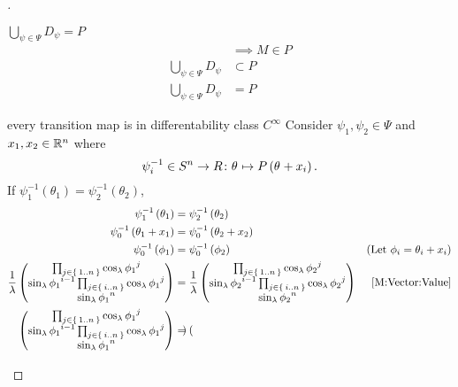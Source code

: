 \documentclass[../main.tex]{subfiles}
\begin{document}
\begin{proof}[]
\begin{subproof}{$\bigcup_{\psi\in\Psi} D_\psi=P$}
\begin{align*}
&\implies M\in P\\
\bigcup_{\psi\in\Psi}D_\psi&\subset P\\
\bigcup_{\psi\in\Psi} D_\psi&= P
\end{align*}
\end{subproof}
\begin{subproof}{every transition map is in differentability class $C^\infty$}
Consider $\psi_1,\psi_2\in\Psi$ and $x_1, x_2\in\mathbb{R}^n$ where
\begin{equation*}
\psi_i^{-1}
\in S^n\to R
\colon\tensor{\theta}{}\mapsto P\left(\tensor{\theta}{}+x_i\right)
\text{.}
\end{equation*}
If $\psi_1^{-1}\left(\theta_1\right)=\psi_2^{-1}\left(\theta_2\right)$,
\begin{align*}
\psi_1^{-1}\left(\theta_1\right)
&=\psi_2^{-1}\left(\theta_2\right)\\
\psi_0^{-1}\left(\theta_1+x_1\right)
&=\psi_0^{-1}\left(\theta_2+x_2\right)\\
\psi_0^{-1}\left(\phi_1\right)
&=\psi_0^{-1}\left(\phi_2\right)&\text{(Let $\phi_i =\theta_i+x_i$)}\\
\frac{1}{\lambda}
\begin{pmatrix}
\prod_{j\in\Set{1..n}}{\cos_\lambda{\tensor{{\phi_1}}{^j}}}\\
\sin_\lambda{\tensor{{\phi_1}}{^{i-1}}}\prod_{j\in\Set{i..n}}{\cos_\lambda{\tensor{{\phi_1}}{^j}}}\\
\sin_\lambda{{\tensor{{\phi_1}}{^n}}}\\
\end{pmatrix}
&=
\frac{1}{\lambda}
\begin{pmatrix}
\prod_{j\in\Set{1..n}}{\cos_\lambda{\tensor{{\phi_2}}{^j}}}\\
\sin_\lambda{\tensor{{\phi_2}}{^{i-1}}}\prod_{j\in\Set{i..n}}{\cos_\lambda{\tensor{{\phi_2}}{^j}}}\\
\sin_\lambda{{\tensor{{\phi_2}}{^n}}}\\
\end{pmatrix}&\text{\cref{M:Vector:Value}}\\
\begin{pmatrix}
\prod_{j\in\Set{1..n}}{\cos_\lambda{\tensor{{\phi_1}}{^j}}}\\
\sin_\lambda{\tensor{{\phi_1}}{^{i-1}}}\prod_{j\in\Set{i..n}}{\cos_\lambda{\tensor{{\phi_1}}{^j}}}\\
\sin_\lambda{{\tensor{{\phi_1}}{^n}}}\\
\end{pmatrix}
&=
\begin{pmatrix}

\end{pmatrix}
\end{align*}
\end{subproof}
\end{proof}
\end{document}
